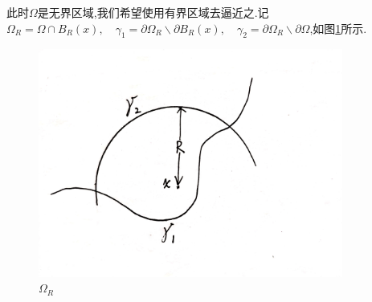 \documentclass[12pt, a4paper]{ctexbook}
\begin{document}
    
    此时$\Omega$是无界区域,我们希望使用有界区域去逼近之.记$\Omega_R=\Omega \cap B_R(x) ,\quad \gamma_1= \partial\Omega_R \backslash \partial B_R(x) ,\quad \gamma_2= \partial\Omega_R \backslash \partial \Omega $,如图\ref{pde1_4_6}所示.
    \begin{figure}[htbp]
        \centering
        \includegraphics[width=10cm]{PDE1_4_6.jpg}
        \caption{$\Omega_R$}
        \label{pde1_4_6}
    \end{figure}
    
\end{document}
